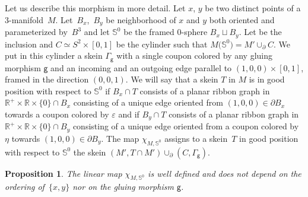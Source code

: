 \documentclass[10pt,a4paper]{amsart}
\newtheorem{proposition}{Proposition}
\numberwithin{equation}{section}
\newcommand{\gm}{{\mathsf{g}}}
\numberwithin{theorem}{section}
\numberwithin{proposition}{section}
\numberwithin{definition}{section}
\numberwithin{lemma}{section}
\numberwithin{corollary}{section}
\numberwithin{remark}{section}
\numberwithin{example}{section}
\newcommand{\R}{\ensuremath{\mathbb{R}}}
\newcommand{\ve}{\varepsilon}
\newcommand{\Sp}{\mathbb{S}}
\begin{document}
Let us describe this morphism in more detail.
Let $x$, $y$ be two distinct points of a 3\nobreakdash-mani\-fold~$M$. Let~$B_x$,~$B_y$
be neighborhood of $x$ and $y$ both oriented and parameterized by~$B^3$
and let ${\Sp^0}$ be the framed 0-sphere $B_x\sqcup B_y$. Let
 be the
inclusion and $C\simeq S^2\times [0,1]$ be the cylinder such that
$M\bigl({\Sp^0}\bigr)=M'\cup_\partial C$. We put in this cylinder a skein $\Gamma_\gm$ with a single coupon
colored by any gluing morphism $\gm$ and an incoming and an outgoing edge
parallel to $(1,0,0)\times [0,1]$, framed in the direction $(0,0,1)$. We will say that a skein $T$ in $M$ is in good position with respect to $\Sp^0$ if $B_x\cap T$ consists of a
planar ribbon graph in $\R^+\times\R\times\{0\}\cap B_x$ consisting of
a unique edge oriented from $(1,0,0)\in\partial B_x$ towards a coupon
colored by $\ve$ and if $B_y\cap T$ consists of a planar ribbon graph
in $\R^+\times\R\times\{0\}\cap B_y$ consisting of a unique edge
oriented from a coupon colored by $\eta$ towards
$(1,0,0)\in\partial B_y$. The map $\chi_{M,{\Sp^0}}$ assigns to a
skein~$T$ in good position
with respect to
 $\Sp^0$ the skein
$(M',
T\cap M')\cup_\partial (C,\Gamma_\gm)$.
\begin{proposition}\label{prop:1handlewelldef}
 The linear map $\chi_{M,\Sp^0}$ is well defined and does not depend
 on the ordering of~$\{x,y\}$ nor
 on the gluing morphism $\gm$.
\end{proposition}
\end{document}

